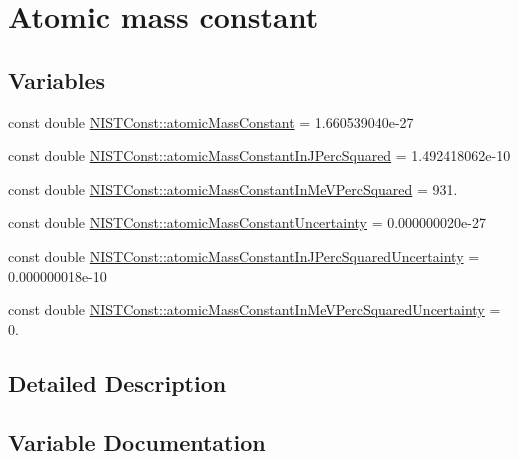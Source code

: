 \hypertarget{group___atomic_mass_constant}{}\section{Atomic mass constant}
\label{group___atomic_mass_constant}
\subsection*{Variables}
\begin{DoxyCompactItemize}
\item 
const double \hyperlink{group___atomic_mass_constant_ga2c815ce73f942601621223bef09be40a}{N\+I\+S\+T\+Const\+::atomic\+Mass\+Constant} = 1.\+660539040e-\/27
\item 
const double \hyperlink{group___atomic_mass_constant_ga59e3df8073f8ba5570bc3c9308655215}{N\+I\+S\+T\+Const\+::atomic\+Mass\+Constant\+In\+J\+Perc\+Squared} = 1.\+492418062e-\/10
\item 
const double \hyperlink{group___atomic_mass_constant_ga8bf06e408e84fc35515a4d6564407467}{N\+I\+S\+T\+Const\+::atomic\+Mass\+Constant\+In\+Me\+V\+Perc\+Squared} = 931.
\item 
const double \hyperlink{group___atomic_mass_constant_gae44d47135c3f8d9e2b9c981649443efc}{N\+I\+S\+T\+Const\+::atomic\+Mass\+Constant\+Uncertainty} = 0.\+000000020e-\/27
\item 
const double \hyperlink{group___atomic_mass_constant_ga297ea3567a4df316bd697b4ec0dc0a65}{N\+I\+S\+T\+Const\+::atomic\+Mass\+Constant\+In\+J\+Perc\+Squared\+Uncertainty} = 0.\+000000018e-\/10
\item 
const double \hyperlink{group___atomic_mass_constant_ga797d82fd682854b4c1b88754bed2e70a}{N\+I\+S\+T\+Const\+::atomic\+Mass\+Constant\+In\+Me\+V\+Perc\+Squared\+Uncertainty} = 0.
\end{DoxyCompactItemize}


\subsection{Detailed Description}


\subsection{Variable Documentation}
\mbox{\label{group___atomic_mass_constant_ga2c815ce73f942601621223bef09be40a}} 
